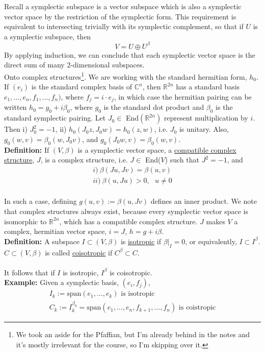 \documentclass[12pt]{report}
\theoremstyle{definition}
\theoremstyle{remark}
\numberwithin{equation}{section}
\theoremstyle{definition}
\newcommand{\bb}[1]{\mathbb{#1}}
\begin{document}
Recall a symplectic subspace is a vector subspace which is also a symplectic vector space by the restriction of the symplectic form. This requirement is equivalent to intersecting trivially with its symplectic complement, so that if $U$ is a symplectic subspace, then 
$$
	V = U \oplus U^\beta
$$
By applying induction, we can conclude that each symplectic vector space is the direct sum of many 2-dimensional subspaces. \\
Onto complex structures\footnote{We took an aside for the Pfaffian, but I'm already behind in the notes and it's mostly irrelevant for the course, so I'm skipping over it.}. We are working with the standard hermitian form, $h_0$. If $(e_i)$ is the standard complex basis of $\bb C^n$, then $\bb R^{2n}$ has a standard basis $e_1, \dots, e_n, f_1, \dots, f_n)$, where $f_j = i\cdot e_j$, in which case the hermitian pairing can be written $h_0 = g_0 + i \beta_0$, where $g_0$ is the standard dot product and $\beta_0$ is the standard symplectic pairing. Let $J_0 \in$ End$(\bb R^{2n})$ represent multiplication by $i$. Then i) $J_0^2 = -1$, ii) $h_0(J_0z, J_0w) = h_0(z,w)$, i.e. $J_0$ is unitary. Also, $g_0(w,v) = \beta_0(w,J_0v)$, and $g_0(J_0w,v) = \beta_0(w,v)$.  \\
\textbf{Definition: }If $(V,\beta)$ is a symplectic vector space, a \underline{compatible complex structure}, $J$, is a complex structure, i.e. $J \in $ End($V$) such that $J^2 = -1$, and 
\begin{gather*}
	i)\ \beta(Ju,Jv) = \beta(u,v)\\
	ii)\ \beta(u,Ju) > 0,\ \ \ u \ne 0 
\end{gather*}
\\
In such a case, defining $g(u,v) := \beta(u,Jv)$ defines an inner product. We note that complex structures always exist, because every symplectic vector space is isomorphic to $\bb R^{2n}$, which has a compatible complex structure. $J$ makes $V$ a complex, hermitian vector space, $i = J$, $h = g + i\beta$. \\
\textbf{Definition: }A subspace $I \subset (V,\beta)$ is \underline{isotropic} if $\beta|_I = 0$, or equivalently, $I \subset I^\beta$. $C \subset (V,\beta)$ is called \underline{coisotropic} if $C^\beta \subset C$. \\\\
It follows that if $I$ is isotropic, $I^\beta$ is coisotropic. \\
\textbf{Example: }Given a symplectic basis, $(e_i,f_j)$, 
\begin{gather*}
	I_k := \text{span}(e_1,\dots,e_k) \text{   is isotropic}\\
	C_k := I_k^{\beta_0} = \text{span}(e_1, \dots, e_n, f_{k+1}, \dots, f_n)\text{    is coistropic}
\end{gather*}	
\end{document}
